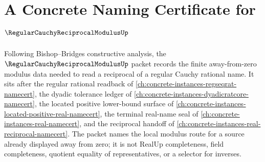 \chapter{A Concrete Naming Certificate for $\RegularCauchyReciprocalModulusUp$}
\label{ch:concrete-instances-regular-cauchy-reciprocal-modulus-namecert}

Following Bishop--Bridges constructive analysis, the $\RegularCauchyReciprocalModulusUp$ packet records the finite away-from-zero modulus data needed to read a reciprocal of a regular Cauchy rational name. It sits after the regular rational readback of \autoref{ch:concrete-instances-regseqrat-namecert}, the dyadic tolerance ledger of \autoref{ch:concrete-instances-dyadicratcore-namecert}, the located positive lower-bound surface of \autoref{ch:concrete-instances-located-positive-real-namecert}, the terminal real-name seal of \autoref{ch:concrete-instances-real-namecert}, and the reciprocal handoff of \autoref{ch:concrete-instances-real-reciprocal-namecert}. The packet names the local modulus route for a source already displayed away from zero; it is not RealUp completeness, field completeness, quotient equality of representatives, or a selector for inverses.

